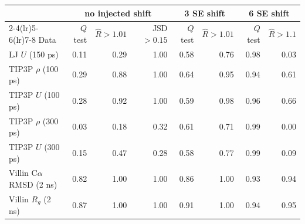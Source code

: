 \begin{tabular}{lrrrrrrr}
\toprule
 & \multicolumn{3}{c}{no injected shift} & \multicolumn{2}{c}{3 SE shift} & \multicolumn{2}{c}{6 SE shift} \\
\cmidrule(lr){2-4}\cmidrule(lr){5-6}\cmidrule(lr){7-8}
Data & $Q$ test & $\hat{R}>1.01$ & JSD$>0.15$ & $Q$ test & $\hat{R}>1.01$ & $Q$ test & $\hat{R}>1.1$ \\
\midrule
LJ $U$ (150 ps) & 0.11 & 0.29 & 1.00 & 0.58 & 0.76 & 0.98 & 0.03 \\
TIP3P $\rho$ (100 ps) & 0.29 & 0.88 & 1.00 & 0.64 & 0.95 & 0.94 & 0.61 \\
TIP3P $U$ (100 ps) & 0.28 & 0.92 & 1.00 & 0.59 & 0.98 & 0.96 & 0.66 \\
TIP3P $\rho$ (300 ps) & 0.03 & 0.18 & 0.32 & 0.61 & 0.71 & 0.99 & 0.00 \\
TIP3P $U$ (300 ps) & 0.15 & 0.47 & 0.28 & 0.58 & 0.77 & 0.99 & 0.09 \\
Villin C$\alpha$ RMSD (2 ns) & 0.82 & 1.00 & 1.00 & 0.86 & 1.00 & 0.93 & 0.94 \\
Villin $R_g$ (2 ns) & 0.87 & 1.00 & 1.00 & 0.91 & 1.00 & 0.94 & 0.95 \\
\bottomrule
\end{tabular}
